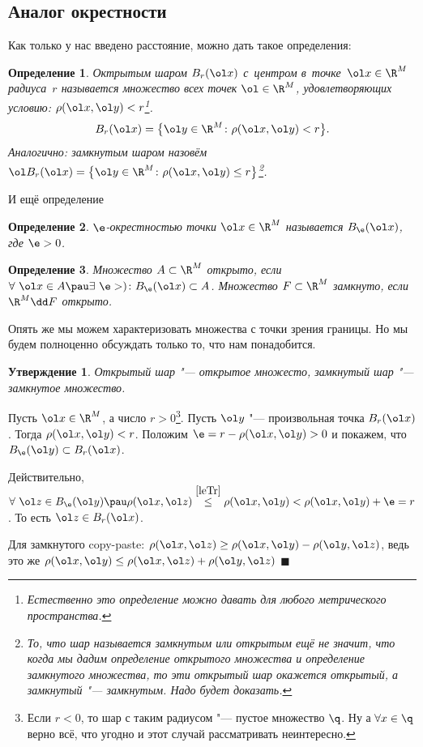 \documentclass[a4paper,10pt,twoside]{article}
\newtheorem{Def}{Определение}[section]
\newtheorem{Ut}{Утверждение}[section]
\newenvironment{Proof}
       {\par\noindent{\textbf{Доказательство.}}}
       {\hfill$\scriptstyle\blacksquare$}
\begin{document}
	 \subsection{Аналог окрестности}
	 Как только у нас введено расстояние, можно дать такое определения:
	 \begin{Def}
	 Октрытым шаром $B_r(\ol x)$ с~центром в~точке~$\ol x\in\R^M$ радиуса~$r$ называется множество всех точек $\ol\in\R^M$,
	 удовлетворяющих условию: $\rho(\ol x,\ol y) < r$\footnote{Естественно это определение можно давать для любого метрического пространства.}.
	 \[ B_r(\ol x) = \big\{\ol y\in\R^M\colon \rho(\ol x,\ol y)<r\big\}.\]
	 Аналогично: замкнутым шаром назовём $\ol B_r(\ol x) = \big\{\ol y\in\R^M\colon\rho(\ol x,\ol y)\leq r\big\}$\footnote{То, что шар называется замкнутым или открытым ещё не значит, что 
	 когда мы дадим определение открытого множества и определение замкнутого множества, то эти открытый шар окажется открытый, а замкнутый "--- замкнутым. Надо будет доказать.}.
	 \end{Def}
	 И ещё определение
	 \begin{Def}
	 $\e$-окрестностью точки $\ol x\in\R^M$ называется $B_\e(\ol x)$, где $\e>0$. 
	 \end{Def}
	 \begin{Def}
	 Множество $A\subset\R^M$ открыто, если $\forall\ \ol x\in A\pau \exists\ \e>)\colon B_\e(\ol x)\subset A$.
	 Множество $F\subset\R^M$ замкнуто, если $\R^M\dd F$ открыто.
	 \end{Def}
	 Опять же мы можем характеризовать множества с точки зрения границы. Но мы будем полноценно обсуждать только то, что нам понадобится.
	 \begin{Ut}
	 Открытый шар "--- открытое множесто, замкнутый шар "--- замкнутое множество.
	 \end{Ut}
	 \begin{Proof}
	 Пусть $\ol x\in \R^M$, а число $r>0$\footnote{Если $r<0$, то шар с таким радиусом "--- пустое множество $\q$. Ну а $\forall x\in\q$ верно всё, что угодно и этот
	 случай рассматривать неинтересно.}. Пусть $\ol y$ "--- произвольная точка $B_r(\ol x)$. Тогда $\rho(\ol x, \ol y)<r$.
	 Положим $\e = r - \rho(\ol x,\ol y) > 0$ и покажем, что $B_\e(\ol y)\subset B_r(\ol x)$.
	 
	 Действительно, $\forall\ \ol z\in B_\e(\ol y)\pau \rho(\ol x,\ol z)\overset{\ref{leTr}}{\leq} \rho(\ol x,\ol y) < \rho(\ol x,\ol y) + \e = r$.
	 То есть $\ol z\in B_r(\ol x)$.
	 
	 Для замкнутого copy-paste: $\rho(\ol x,\ol z)\geq\rho(\ol x,\ol y) - \rho(\ol y,\ol z)$, ведь это же $\rho(\ol x,\ol y)\leq \rho(\ol x,\ol z) + \rho(\ol y,\ol z)$
	 \end{Proof}
\end{document}
